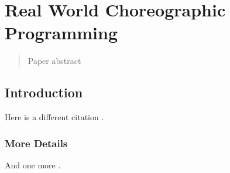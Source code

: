 \chapter{Real World Choreographic Programming}
\label{sec:multichor}

\begin{quote}
Paper abstract
\end{quote}


\section{Introduction}
Here is a different citation .  

\subsection{More Details}

And one more .



